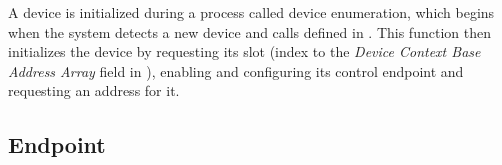 A device is initialized during a process called device enumeration, which begins when
the system detects a new device and calls  defined in
. This function then initializes the device
by requesting its slot (index to the \textit{Device Context Base Address Array} field in
), enabling and configuring its control endpoint and requesting
an address for it.

\subsection{Endpoint}



